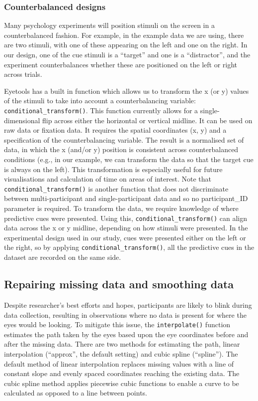 \documentclass[
  man,
  floatsintext,
  longtable,
  nolmodern,
  notxfonts,
  notimes,
  colorlinks=true,linkcolor=blue,citecolor=blue,urlcolor=blue]{apa7}
\begin{document}
\subsubsection{Counterbalanced designs}\label{counterbalanced-designs}

Many psychology experiments will position stimuli on the screen in a
counterbalanced fashion. For example, in the example data we are using,
there are two stimuli, with one of these appearing on the left and one
on the right. In our design, one of the cue stimuli is a ``target'' and
one is a ``distractor'', and the experiment counterbalances whether
these are positioned on the left or right across trials.

Eyetools has a built in function which allows us to transform the x (or
y) values of the stimuli to take into account a counterbalancing
variable: \texttt{conditional\_transform()}. This function currently
allows for a single-dimensional flip across either the horizontal or
vertical midline. It can be used on raw data or fixation data. It
requires the spatial coordinates (x, y) and a specification of the
counterbalancing variable. The result is a normalised set of data, in
which the x (and/or y) position is consistent across counterbalanced
conditions (e.g., in our example, we can transform the data so that the
target cue is always on the left). This transformation is especially
useful for future visualisations and calculation of time on areas of
interest. Note that \texttt{conditional\_transform()} is another
function that does not discriminate between multi-participant and
single-participant data and so no participant\_ID parameter is required.
To transform the data, we require knowledge of where predictive cues
were presented. Using this, \texttt{conditional\_transform()} can align
data across the x or y midline, depending on how stimuli were presented.
In the experimental design used in our study, cues were presented either
on the left or the right, so by applying
\texttt{conditional\_transform()}, all the predictive cues in the
dataset are recorded on the same side.

\subsection{Repairing missing data and smoothing
data}\label{repairing-missing-data-and-smoothing-data}

Despite researcher's best efforts and hopes, participants are likely to
blink during data collection, resulting in observations where no data is
present for where the eyes would be looking. To mitigate this issue, the
\texttt{interpolate()} function estimates the path taken by the eyes
based upon the eye coordinates before and after the missing data. There
are two methods for estimating the path, linear interpolation
(``approx'', the default setting) and cubic spline (``spline''). The
default method of linear interpolation replaces missing values with a
line of constant slope and evenly spaced coordinates reaching the
existing data. The cubic spline method applies piecewise cubic functions
to enable a curve to be calculated as opposed to a line between points.
\end{document}
